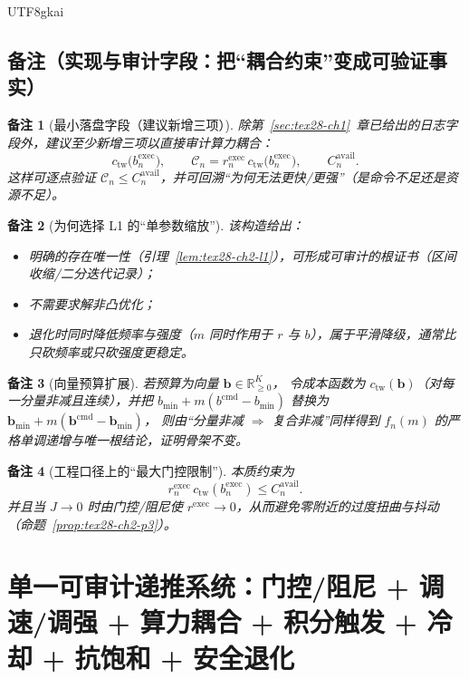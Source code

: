 \documentclass[12pt]{article}
\newtheorem{remark}{备注}[section]
\newcommand{\RR}{\mathbb{R}}
\begin{document}
\begin{CJK*}{UTF8}{gkai}
\subsection{备注（实现与审计字段：把“耦合约束”变成可验证事实）}
\label{subsec:tex28-ch2-remarks}

\begin{remark}[最小落盘字段（建议新增三项）]
除第~\ref{sec:tex28-ch1}~章已给出的日志字段外，建议至少新增三项以直接审计算力耦合：
\[
  c_{\mathrm{tw}}\bigl(b^{\mathrm{exec}}_n\bigr),
  \qquad
  \mathcal{C}_n=r^{\mathrm{exec}}_n\,c_{\mathrm{tw}}\bigl(b^{\mathrm{exec}}_n\bigr),
  \qquad
  C^{\mathrm{avail}}_n.
\]
这样可逐点验证 $\mathcal{C}_n\le C^{\mathrm{avail}}_n$，并可回溯“为何无法更快/更强”（是命令不足还是资源不足）。
\end{remark}

\begin{remark}[为何选择 L1 的“单参数缩放”]
该构造给出：
\begin{itemize}
  \item 明确的存在唯一性（引理~\ref{lem:tex28-ch2-l1}），可形成可审计的根证书（区间收缩/二分迭代记录）；
  \item 不需要求解非凸优化；
  \item 退化时同时降低频率与强度（$m$ 同时作用于 $r$ 与 $b$），属于平滑降级，通常比只砍频率或只砍强度更稳定。
\end{itemize}
\end{remark}

\begin{remark}[向量预算扩展]
若预算为向量 $\mathbf{b}\in\RR_{\ge 0}^{K}$，
令成本函数为 $c_{\mathrm{tw}}(\mathbf{b})$（对每一分量非减且连续），并把
$b_{\min}+m(b^{\mathrm{cmd}}-b_{\min})$ 替换为
$\mathbf{b}_{\min}+m(\mathbf{b}^{\mathrm{cmd}}-\mathbf{b}_{\min})$，
则由“分量非减 $\Rightarrow$ 复合非减”同样得到 $f_n(m)$ 的严格单调递增与唯一根结论，证明骨架不变。
\end{remark}

\begin{remark}[工程口径上的“最大门控限制”]
本质约束为
\[
  r^{\mathrm{exec}}_n\,c_{\mathrm{tw}}(b^{\mathrm{exec}}_n)\le C^{\mathrm{avail}}_n.
\]
并且当 $J\to 0$ 时由门控/阻尼使 $r^{\mathrm{exec}}\to 0$，从而避免零附近的过度扭曲与抖动（命题~\ref{prop:tex28-ch2-p3}）。
\end{remark}

\clearpage

\section{单一可审计递推系统：门控/阻尼 + 调速/调强 + 算力耦合 + 积分触发 + 冷却 + 抗饱和 + 安全退化}
\label{sec:tex28-ch3}


\end{CJK*}
\end{document}
